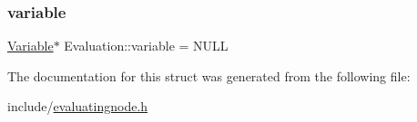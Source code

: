 \mbox{\label{structEvaluation_a96871a714d91ba54beaf1526d9185ca0}} 
\subsubsection{\texorpdfstring{variable}{variable}}
{\footnotesize\ttfamily \hyperlink{classVariable}{Variable}$\ast$ Evaluation\+::variable = N\+U\+LL}



The documentation for this struct was generated from the following file\+:\begin{DoxyCompactItemize}
\item 
include/\hyperlink{evaluatingnode_8h}{evaluatingnode.\+h}\end{DoxyCompactItemize}
